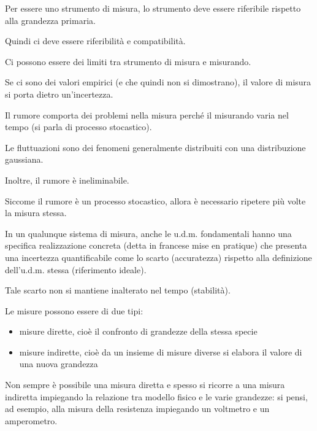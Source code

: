 Per essere uno strumento di misura, lo strumento deve essere riferibile rispetto alla grandezza primaria. \newline 

Quindi ci deve essere riferibilità e compatibilità. \newline 

Ci possono essere dei limiti tra strumento di misura e misurando. \newline 

Se ci sono dei valori empirici (e che quindi non si dimostrano), il valore di misura si porta dietro un'incertezza. \newline 

Il rumore comporta dei problemi nella misura perché il misurando varia nel tempo (si parla di processo stocastico). \newline 

Le fluttuazioni sono dei fenomeni generalmente distribuiti con una distribuzione gaussiana. \newline 

Inoltre, il rumore è ineliminabile. \newline 

Siccome il rumore è un processo stocastico, allora è necessario ripetere più volte la misura stessa. \newline 

In un qualunque sistema di misura, anche le u.d.m. fondamentali hanno una specifica realizzazione concreta (detta in francese mise en pratique) 
che presenta una incertezza quantificabile come lo scarto (accuratezza) rispetto alla definizione dell'u.d.m. stessa (riferimento ideale). \newline 

Tale scarto non si mantiene inalterato nel tempo (stabilità). \newline 

\newpage 

Le misure possono essere di due tipi: 

\begin{itemize}
    \item misure dirette, cioè il confronto di grandezze della stessa specie  
    \item misure indirette, cioè da un insieme di misure diverse si elabora il valore di una nuova grandezza
\end{itemize}

Non sempre è possibile una misura diretta e spesso si ricorre a una misura indiretta impiegando la relazione tra modello fisico e le varie grandezze: 
si pensi, ad esempio, alla misura della resistenza impiegando un voltmetro e un amperometro. \newline 


